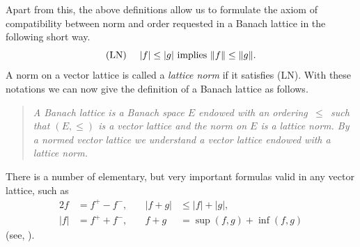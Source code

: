 Apart from this, the above definitions allow us to formulate the axiom of compatibility between norm and order requested in a Banach lattice in the following short way.
\begin{equation*}
	\text{(LN)} \quad \text{ $|f| \leq |g|$ implies $ \|f\| \leq \|g\| $.}   
\end{equation*}
A norm on a vector lattice is called a \emph{lattice norm} if it satisfies (LN).
With these notations we can now give the definition of a Banach lattice as follows.
\begin{quote}
\textit{A \emph{Banach lattice} is a Banach space $ E $ endowed with an ordering $ \,\leq\, $ such that $ (E,\leq) $ is a vector lattice and the norm on $ E $ is a lattice norm.
By a \emph{normed vector lattice} we understand a vector lattice endowed with a lattice norm.}
\end{quote}
There is a number of elementary, but very important formulas valid in any vector lattice, such as
\begin{alignat*}{2}
f &= f^{+} - f^{-} ,   &\quad |f + g| & \leq |f| + |g|, \\
|f| &= f^{+} + f^{-} , &\quad  f + g  & = \sup(f,g) + \inf(f,g)
\end{alignat*}
(see, \eg \textcite[Chap. II, §1]{schaefer:1974}).

